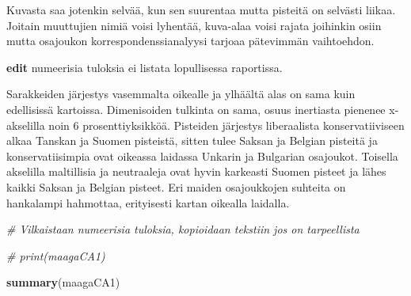 \documentclass[
  finnish,
]{book}
\newenvironment{Shaded}{\begin{snugshade}}{\end{snugshade}}
\newcommand{\CommentTok}[1]{\textcolor[rgb]{0.56,0.35,0.01}{\textit{#1}}}
\newcommand{\KeywordTok}[1]{\textcolor[rgb]{0.13,0.29,0.53}{\textbf{#1}}}
\newcommand{\NormalTok}[1]{#1}
\begin{document}
Kuvasta saa jotenkin selvää, kun sen suurentaa mutta pisteitä on selvästi liikaa.
Joitain muuttujien nimiä voisi lyhentää, kuva-alaa voisi rajata joihinkin osiin
mutta osajoukon korrespondenssianalyysi tarjoaa pätevimmän vaihtoehdon.

\textbf{edit} numeerisia tuloksia ei listata lopullisessa raportissa.

Sarakkeiden järjestys vasemmalta oikealle ja ylhäältä alas on sama kuin edellisissä
kartoissa. Dimenisoiden tulkinta on sama, osuus inertiasta pienenee x-akselilla
noin 6 prosenttiyksikköä. Pisteiden järjestys liberaalista konservatiiviseen
alkaa Tanskan ja Suomen pisteistä, sitten tulee Saksan ja Belgian pisteitä ja
konservatiisimpia ovat oikeassa laidassa Unkarin ja Bulgarian osajoukot. Toisella
akselilla maltillisia ja neutraaleja ovat hyvin karkeasti Suomen pisteet ja lähes
kaikki Saksan ja Belgian pisteet. Eri maiden osajoukkojen suhteita on hankalampi
hahmottaa, erityisesti kartan oikealla laidalla.

\begin{Shaded}
\begin{Highlighting}[]
\CommentTok{# Vilkaistaan numeerisia tuloksia, kopioidaan tekstiin jos on tarpeellista}

\CommentTok{# print(maagaCA1)}

\KeywordTok{summary}\NormalTok{(maagaCA1)}
\end{Highlighting}
\end{Shaded}
\end{document}
